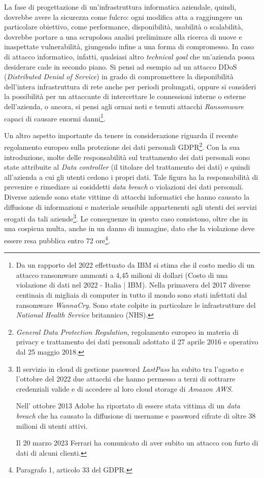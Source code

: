 \documentclass[target=bach,aauheader=]{thud}
\begin{document}
La fase di progettazione di un’infrastruttura informatica aziendale, quindi, dovrebbe avere la sicurezza come fulcro: ogni modifica atta a raggiungere un particolare obiettivo, come performance, disponibilità, usabilità o scalabilità, dovrebbe portare a una scrupolosa analisi preliminare alla ricerca di nuove e inaspettate vulnerabilità, giungendo infine a una forma di compromesso. In caso di attacco informatico, infatti, qualsiasi altro \textit{technical goal} che un’azienda possa desiderare cade in secondo piano. Si pensi ad esempio ad un attacco DDoS (\textit{Distributed Denial of Service}) in grado di compromettere la disponibilità dell’intera infrastruttura di rete anche per periodi prolungati, oppure si consideri la possibilità per un attaccante di intercettare le connessioni interne o esterne dell’azienda, o ancora, si pensi agli ormai noti e temuti attacchi \textit{Ransomware} capaci di causare enormi danni\footnote{Da un rapporto del 2022 effettuato da IBM si stima che il costo medio di un attacco ransomware ammonti a 4,45 milioni di dollari (Costo di una violazione di dati nel 2022 - Italia | IBM).
Nella primavera del 2017 diverse centinaia di migliaia di computer in tutto il mondo sono stati infettati dal ransomware \textit{WannaCry}. Sono state colpite in particolare le infrastrutture del \textit{National Health Service} britannico (NHS).
}.

Un altro aspetto importante da tenere in considerazione riguarda il recente regolamento europeo sulla protezione dei dati personali GDPR\footnote{\textit{General Data Protection Regulation}, regolamento europeo in materia di privacy e trattamento dei dati personali adottato il 27 aprile 2016 e operativo dal 25 maggio 2018.}. Con la sua introduzione, molte delle responsabilità sul trattamento dei dati personali sono state attribuite al \textit{Data controller} (il titolare del trattamento dei dati) e quindi all’azienda a cui gli utenti cedono i propri dati. Tale figura ha la responsabilità di prevenire e rimediare ai cosiddetti \textit{data breach} o violazioni dei dati personali. Diverse aziende sono state vittime di attacchi informatici che hanno causato la diffusione di informazioni e materiale sensibile appartenenti agli utenti dei servizi erogati da tali aziende\footnote{Il servizio in cloud di gestione password \textit{LastPass} ha subito tra l’agosto e l’ottobre del 2022 due attacchi che hanno permesso a terzi di sottrarre credenziali valide e di accedere al loro cloud storage di \textit{Amazon AWS}.

Nell’ ottobre 2013 Adobe ha riportato di essere stata vittima di un \textit{data breach} che ha causato la diffusione di username e password cifrate di oltre 38 milioni di utenti attivi.

Il 20 marzo 2023 Ferrari ha comunicato di aver subito un attacco con furto di dati di alcuni clienti.
}. Le conseguenze in questo caso consistono, oltre che in una cospicua multa, anche in un danno di immagine, dato che la violazione deve essere resa pubblica entro 72 ore\footnote{Paragrafo 1, articolo 33 del GDPR.}.
\end{document}
